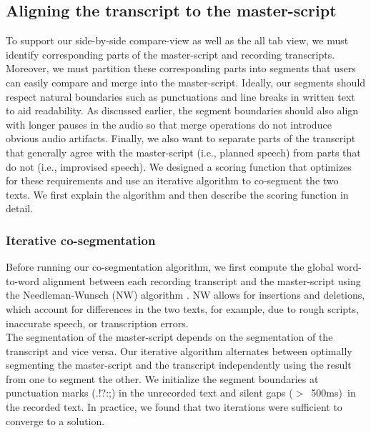 \subsection{Aligning the transcript to the master-script}
To support our side-by-side compare-view as well as the all tab view, we must identify corresponding parts of the master-script and recording transcripts. Moreover, we must partition these corresponding parts into segments that users can easily compare and merge into the master-script. Ideally, our segments should respect natural boundaries such as punctuations and line breaks in written text to aid readability. As discussed earlier, the segment boundaries should also align with longer pauses in the audio so that merge operations do not introduce obvious audio artifacts. Finally, we also want to separate parts of the transcript that generally agree with the master-script (i.e., planned speech) from parts that do not (i.e., improvised speech).  We designed a scoring function that optimizes for these requirements and use an iterative algorithm to co-segment the two texts. We first explain the algorithm and then describe the scoring function in detail.

\subsubsection{Iterative co-segmentation}
Before running our co-segmentation algorithm, we first compute the global word-to-word alignment between each recording transcript and the master-script using the Needleman-Wunsch (NW) algorithm \cite{needleman1970general}. NW allows for insertions and deletions, which account for differences in the two texts, for example, due to rough scripts, inaccurate speech, or transcription errors.\\

The segmentation of the master-script depends on the segmentation of the transcript and vice versa. Our iterative algorithm alternates between optimally segmenting the master-script and the transcript independently using the result from one to segment the other. We initialize the segment boundaries at punctuation marks (.!?:;) in the unrecorded text and silent gaps ($>$\ 500ms)\ in the recorded text. In practice, we
found that two iterations were sufficient to converge to a solution.\\

